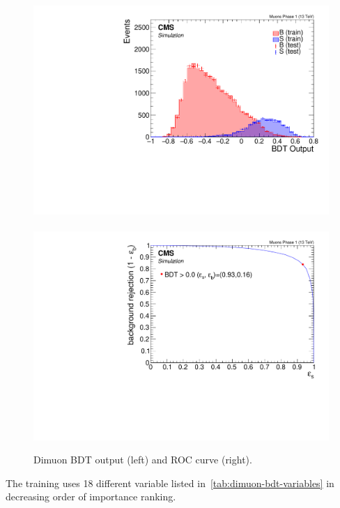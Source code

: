 \begin{figure}[!htb]
\centering
\includegraphics[width=0.48\linewidth]{plots/dimuon_bdt/overtraining_Event_Dilepton_Muons_Phase_1.pdf} \,
\includegraphics[width=0.48\linewidth]{plots/dimuon_bdt/roc_Event_Dilepton_Muons_Phase_1.pdf} \\


\caption[Dimuon BDT output and ROC curve]{Dimuon BDT output (left) and ROC curve (right).}
\label{fig:event-bdt-dimuon-output}
\end{figure}

The training uses 18 different variable listed in~\ref{tab:dimuon-bdt-variables} in decreasing order of importance ranking.


